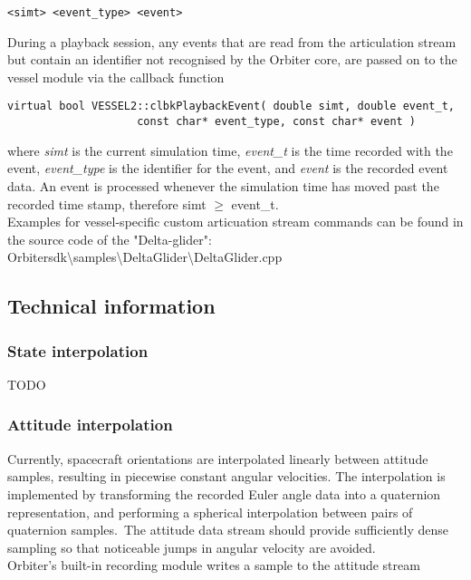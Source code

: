 \documentclass[Orbiter Technical Reference.tex]{subfiles}
\begin{document}
\begin{lstlisting}[language=OSFS]
<simt> <event_type> <event>
\end{lstlisting}

\noindent
During a playback session, any events that are read from the articulation stream but contain an identifier not recognised by the Orbiter core, are passed on to the vessel module via the callback function

\begin{lstlisting}
virtual bool VESSEL2::clbkPlaybackEvent( double simt, double event_t,
					const char* event_type, const char* event )
\end{lstlisting}

\noindent
where \textit{simt} is the current simulation time, \textit{event\_t} is the time recorded with the event, \textit{event\_type} is the identifier for the event, and \textit{event} is the recorded event data. An event is processed whenever the simulation time has moved past the recorded time stamp, therefore simt $\geq$ event\_t.\\
Examples for vessel-specific custom articuation stream commands can be found in the source code of the "Delta-glider": Orbitersdk\textbackslash samples\textbackslash DeltaGlider\textbackslash DeltaGlider.cpp

\subsection{Technical information}
\subsubsection{State interpolation}
TODO

\subsubsection{Attitude interpolation}
Currently, spacecraft orientations are interpolated linearly between attitude samples, resulting in piecewise constant angular velocities. The interpolation is implemented by transforming the recorded Euler angle data into a quaternion representation, and performing a spherical interpolation between pairs of quaternion samples.\
The attitude data stream should provide sufficiently dense sampling so that noticeable jumps in angular velocity are avoided.\\
Orbiter's built-in recording module writes a sample to the attitude stream
\end{document}
